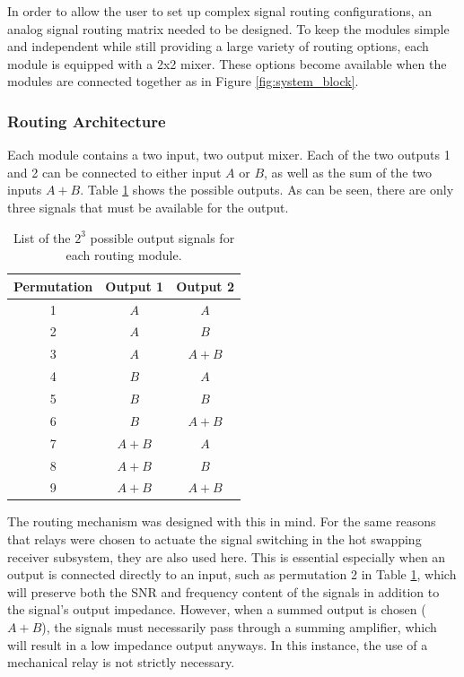 

	In order to allow the user to set up complex signal routing configurations, an analog signal routing matrix needed to be designed.  To keep the modules simple and independent while still providing a large variety of routing options, each module is equipped with a 2x2 mixer.  These options become available when the modules are connected together as in Figure \ref{fig:system_block}.

	\subsubsection{Routing Architecture}

	Each module contains a two input, two output mixer. Each of the two outputs 1 and 2 can be connected to either input $A$ or $B$, as well as the sum of the two inputs $A + B$.  Table \ref{tab:routing_outputs} shows the possible outputs.  As can be seen, there are only three signals that must be available for the output.

	\begin{table}
	\begin{center}
	\begin{tabular}{ |c|c c| }
	\hline
	 Permutation & Output 1 & Output 2 \\ 
	 \hline
	 1 	& $A$ 	& $A$ \\  
	 2 	& $A$ 	& $B$ \\
	 3	& $A$ 	& $A+B$ \\
	 4	& $B$ 	& $A$ \\
	 5	& $B$ 	& $B$ \\
	 6	& $B$ 	& $A+B$ \\
	 7	& $A+B$ & $A$ \\
	 8	& $A+B$ & $B$ \\
	 9	& $A+B$ & $A+B$ \\
	 \hline
	\end{tabular}
	\caption{List of the $2^3$ possible output signals for each routing module.}
	\label{tab:routing_outputs}
	\end{center}
	\end{table}

	The routing mechanism was designed with this in mind.  For the same reasons that relays were chosen to actuate the signal switching in the hot swapping receiver subsystem, they are also used here.  This is essential especially when an output is connected directly to an input, such as permutation 2 in Table \ref{tab:routing_outputs}, which will preserve both the SNR and frequency content of the signals in addition to the signal's output impedance.  However, when a summed output is chosen ($A+B$), the signals must necessarily pass through a summing amplifier, which will result in a low impedance output anyways.  In this instance, the use of a mechanical relay is not strictly necessary.

